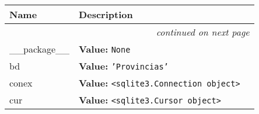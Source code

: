    \vspace{-1cm}
\hspace{\varindent}\begin{longtable}{|p{\varnamewidth}|p{\vardescrwidth}|l}
\cline{1-2}
\cline{1-2} \centering \textbf{Name} & \centering \textbf{Description}& \\
\cline{1-2}
\endhead\cline{1-2}\multicolumn{3}{r}{\small\textit{continued on next page}}\\\endfoot\cline{1-2}
\endlastfoot\raggedright \_\-\_\-p\-a\-c\-k\-a\-g\-e\-\_\-\_\- & \raggedright \textbf{Value:} 
{\tt None}&\\
\cline{1-2}
\raggedright b\-d\- & \raggedright \textbf{Value:} 
{\tt \texttt{'}\texttt{Provincias}\texttt{'}}&\\
\cline{1-2}
\raggedright c\-o\-n\-e\-x\- & \raggedright \textbf{Value:} 
{\tt {\textless}sqlite3.Connection object{\textgreater}}&\\
\cline{1-2}
\raggedright c\-u\-r\- & \raggedright \textbf{Value:} 
{\tt {\textless}sqlite3.Cursor object{\textgreater}}&\\
\cline{1-2}
\end{longtable}

